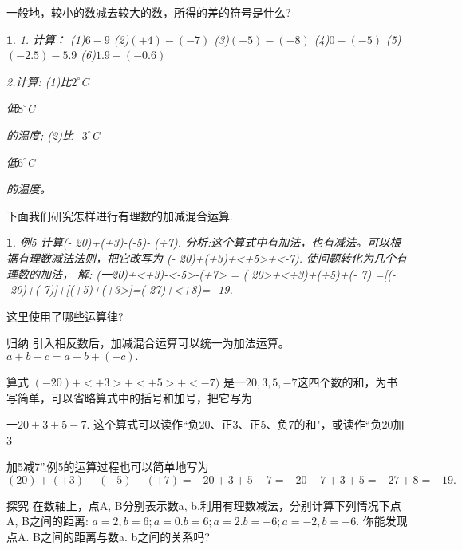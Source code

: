 \documentclass[UTF8]{article}
\newtheorem{exercise}{ }
\newtheorem{example}{ }
\begin{document}
一般地，较小的数减去较大的数，所得的差的符号是什么?
\begin{exercise}
1. 计算：
(1)$6-9$
(2)$(+4)-(-7)$
(3)$(-5)-(-8)$
(4)$0-(-5)$
(5)$(-2.5)-5.9$
(6)$1.9-(-0.6)$

2.计算:
(1)比$2^\circ$C \par 低$8^\circ$C \par 的温度;
(2)比$-3^\circ$C \par 低$6^\circ$C \par 的温度。

\end{exercise}

下面我们研究怎样进行有理数的加减混合运算.

\begin{example}
例5 计算(- 20)+(+3)-(-5)- (+7).
分析:这个算式中有加法，也有减法。可以根据有理数减法法则，把它改写为
	(- 20)+(+3)+<+5>+<-7).
使问题转化为几个有理数的加法，
解:  (一20)+<+3)-<-5>-(+7>
	= ( 20>+<+3)+(+5)+(- 7)
	=[(- -20)+(-7)]+[(+5)+(+3>]=(-27)+<+8)= -19.
\end{example}
这里使用了哪些运算律?

归纳
引入相反数后，加减混合运算可以统一为加法运算。
	$a+b-c=a+b+(-c).$	

算式
	$(- 20)+<+3>+<+5>+<-7)$
是$一20, 3, 5, -7$这四个数的和，为书写简单，可以省略算式中的括号和加号，把它写为

	$一20+3+5-7.$
这个算式可以读作“负20、正3、正5、负7的和"，或读作“负20加3

加5减7”.例5的运算过程也可以简单地写为
	$( 20)+(+3)-(-5)- (+7)
	= - 20+3+5-7
	=-20-7+3+5
	=-27+8
	=- 19.$

探究
在数轴上，点A, B分别表示数a, b.利用有理数减法，分别计算下列情况下点A, B之间的距离:
	$a=2, b=6; a=0. b=6; a=2. b=-6; a=-2, b=-6.$
你能发现点A. B之间的距离与数a. b之间的关系吗?
\end{document}
